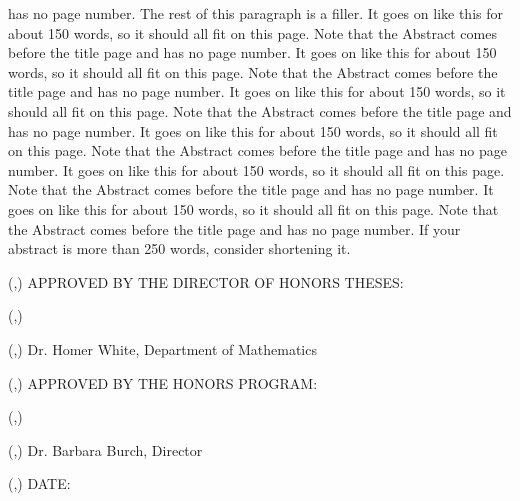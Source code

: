 \documentclass[
  letterpaper,
]{scrreprt}
\theoremstyle{remark}
\begin{document}
\begin{titlepage}
\begin{textblock*}{\textwidth}
has no page number. The rest of this paragraph is a filler. It goes on like this for about 150
words, so it should all fit on this page. Note that the Abstract comes before the title page and has
no page number. It goes on like this for about 150 words, so it should all fit on this page. Note
that the Abstract comes before the title page and has no page number. It goes on like this for
about 150 words, so it should all fit on this page. Note that the Abstract comes before the title
page and has no page number. It goes on like this for about 150 words, so it should all fit on this
page. Note that the Abstract comes before the title page and has no page number. It goes on like
this for about 150 words, so it should all fit on this page. Note that the Abstract comes before the
title page and has no page number. It goes on like this for about 150 words, so it should all fit on
this page. Note that the Abstract comes before the title page and has no page number. If your
abstract is more than 250 words, consider shortening it.
\end{textblock*}
\pagebreak
\thispagestyle{empty}
\begin{textblock*}{\paperwidth}(\fromleft{2in},\fromtop{144pt})
APPROVED BY THE DIRECTOR OF HONORS THESES:
\end{textblock*}
\begin{textblock*}{\paperwidth}(\fromleft{3in},\fromtop{192pt})
\underline{\hspace{4.5in}}
\end{textblock*}
\begin{textblock*}{\paperwidth}(\fromleft{3in},\fromtop{216pt})
Dr. Homer White, Department of Mathematics
\end{textblock*}
\begin{textblock*}{\paperwidth}(\fromleft{2in},\fromtop{396pt})
APPROVED BY THE HONORS PROGRAM:
\end{textblock*}
\begin{textblock*}{\paperwidth}(\fromleft{2in},\fromtop{444pt})
\underline{\hspace{4.5in}}
\end{textblock*}
\begin{textblock*}{\paperwidth}(\fromleft{2in},\fromtop{468pt})
Dr. Barbara Burch, Director
\end{textblock*}
\begin{textblock*}{\paperwidth}(\fromleft{1.5in},\fromtop{612pt})
DATE:\underline{\hspace{2in}}
\end{textblock*}
\end{titlepage}%
\theoremstyle{plain}
\newtheorem*{thm}{Theorem}
\newcommand{\thmnm}{Theorem}
\newtheorem*{namedthm}{\thmnm}
\theoremstyle{definition}
\newtheorem*{dfn}{Definition}
\newcommand{\defnm}{Definition}
\newtheorem*{nameddfn}{\defnm}
\end{document}
